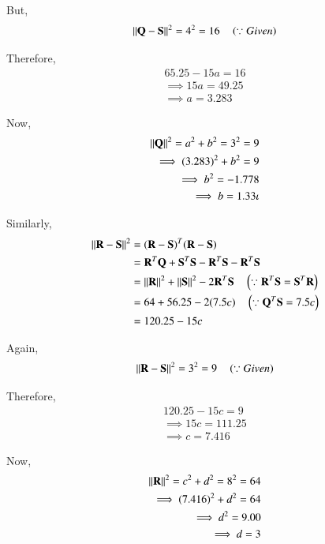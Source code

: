 \documentclass[journal,12pt,twocolumn]{IEEEtran}
\begin{document}
But,
\begin{align}
\left\lVert{\mathbf{Q}-\mathbf{S}}\right\rVert^2=4^2=16 \quad \left(\because Given\right)
\end{align}

Therefore,
\begin{align}
65.25 - 15a = 16
\\
\implies 15a = 49.25
\\
\implies a = 3.283
\end{align}

Now,
\begin{align}
\left\lVert\mathbf{Q}\right\rVert^2  = a^2 + b^2 =3^2 =9
\\
\implies (3.283)^2 + b^2 =9
\\
\implies b^2 = -1.778
\\
\implies b = 1.33\iota
\end{align}

Similarly,
\begin{align}
\left\lVert\mathbf{R}-\mathbf{S}\right\rVert^2 &= ({\mathbf{R}-\mathbf{S}})^T({\mathbf{R}-\mathbf{S}})
\\
&= \mathbf{R}^T\mathbf{Q}+\mathbf{S}^T\mathbf{S}-\mathbf{R}^T\mathbf{S} - \mathbf{R}^T\mathbf{S}
\\
&= \left\lVert\mathbf{R}\right\rVert^2 + \left\lVert\mathbf{S}\right\rVert^2 - 2\mathbf{R}^T\mathbf{S} \quad \left(\because \mathbf{R}^T\mathbf{S} = \mathbf{S}^T\mathbf{R} \right) 
\\
&= 64 + 56.25 -2(7.5c) \quad \left(\because \mathbf{Q}^T\mathbf{S} = 7.5c \right) 
\\
&= 120.25 - 15c
\end{align}

Again,
\begin{align}
\left\lVert{\mathbf{R}-\mathbf{S}}\right\rVert^2=3^2=9 \quad \left(\because Given\right)
\end{align}

Therefore,
\begin{align}
120.25 - 15c = 9
\\
\implies 15c = 111.25
\\
\implies c = 7.416
\end{align}

Now,
\begin{align}
\left\lVert\mathbf{R}\right\rVert^2  = c^2 + d^2 =8^2 = 64
\\
\implies (7.416)^2 + d^2 = 64
\\
\implies d^2 = 9.00
\\
\implies d = 3
\end{align}
\end{document}

